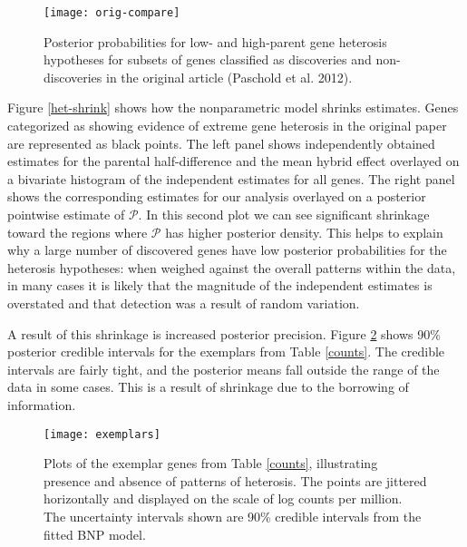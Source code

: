{\begin{figure}[h!]
\centering
\texttt{[image: orig-compare]}
\begin{minipage}{.8\textwidth}
\caption{\small Posterior probabilities for low- and high-parent gene heterosis hypotheses for subsets of genes classified as discoveries and non-discoveries in the original article (Paschold et al. 2012).}
\label{orig-compare}
\end{minipage}
\end{figure}

Figure \ref{het-shrink} shows how the nonparametric model shrinks estimates. Genes categorized as showing evidence of extreme gene heterosis in the original paper are represented as black points. The left panel shows independently obtained estimates for the parental half-difference and the mean hybrid effect overlayed on a bivariate histogram of the independent estimates for all genes. The right
panel shows the corresponding estimates for our analysis overlayed on a posterior pointwise estimate of $\mathcal{P}$. In this second plot we can see significant shrinkage toward the regions where $\mathcal{P}$ has higher posterior density. This helps to explain why a large number of discovered genes have low posterior probabilities for the heterosis hypotheses: when weighed against the overall patterns within the data, in many cases it is likely that the magnitude of the independent estimates is overstated and that detection was a result of random variation.

A result of this shrinkage is increased posterior precision. Figure \ref{exemplars} shows 90\% posterior credible intervals for the exemplars from Table \ref{counts}. The credible intervals are fairly tight, and the posterior means fall outside the range of the data in some cases. This is a result of shrinkage due to the borrowing of information.

\begin{figure}[ht!]
\centering
\texttt{[image: exemplars]}
\begin{minipage}{.8\textwidth}
\caption{\small Plots of the exemplar genes from Table \ref{counts}, illustrating presence and absence of patterns of heterosis. The points are jittered horizontally and displayed on the scale of log counts per million. The uncertainty intervals shown are 90\% credible intervals from the fitted BNP model.}
\label{exemplars}
\end{minipage}
\end{figure}

}
